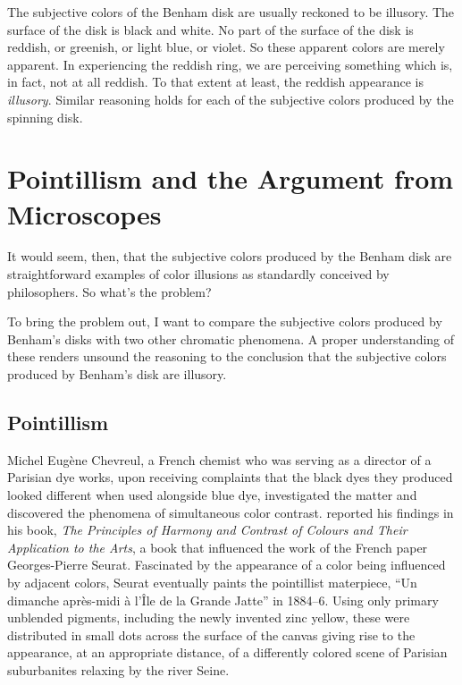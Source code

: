 \documentclass[12pt]{article}
\begin{document}
The subjective colors of the Benham disk are usually reckoned to be illusory. The surface of the disk is black and white. No part of the surface of the disk is reddish, or greenish, or light blue, or violet. So these apparent colors are merely apparent. In experiencing the reddish ring, we are perceiving something which is, in fact, not at all reddish. To that extent at least, the reddish appearance is \emph{illusory}. Similar reasoning holds for each of the subjective colors produced by the spinning disk.

\section{Pointillism and the Argument from Microscopes}\label{sec:pointillism_and_the_argument_from_microscopes} %

It would seem, then, that the subjective colors produced by the Benham disk are straightforward examples of color illusions as standardly conceived by philosophers. So what's the problem?

To bring the problem out, I want to compare the subjective colors produced by Benham's disks with two other chromatic phenomena. A proper understanding of these renders unsound the reasoning to the conclusion that the subjective colors produced by Benham's disk are illusory.


\subsection{Pointillism}\label{sub:pointillism} %

Michel Eugène Chevreul, a French chemist who was serving as a director of a Parisian dye works, upon receiving complaints that the black dyes they produced looked different when used alongside blue dye, investigated the matter and discovered the phenomena of simultaneous color contrast. \citet{Chevreul:1855kx} reported his findings in his book, \emph{The Principles of Harmony and Contrast of Colours and Their Application to the Arts}, a book that influenced the work of the French paper Georges-Pierre Seurat. Fascinated by the appearance of a color being influenced by adjacent colors, Seurat eventually paints the pointillist materpiece, “Un dimanche après-midi à l'Île de la Grande Jatte” in 1884--6. Using only primary unblended pigments, including the newly invented zinc yellow, these were distributed in small dots across the surface of the canvas giving rise to the appearance, at an appropriate distance, of a differently colored scene of Parisian suburbanites relaxing by the river Seine.
\end{document}
